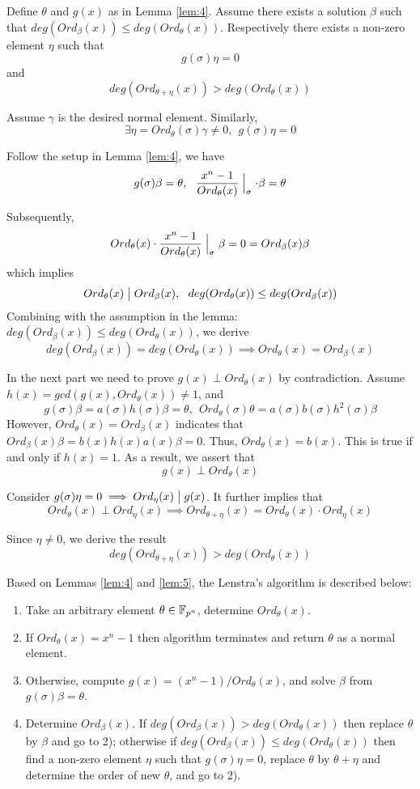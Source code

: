 \begin{Lemma}
\label{lem:5}
Define $\theta$ and $g(x)$ as in Lemma \ref{lem:4}. Assume there exists a solution 
$\beta$ such that $deg(Ord_\beta(x)) \leq deg(Ord_\theta(x))$. Respectively there exists a non-zero element $\eta$ such that
$$g(\sigma)\eta = 0$$
and
$$deg(Ord_{\theta+\eta}(x)) > deg(Ord_\theta(x))$$
\end{Lemma}
\begin{Proof}
Assume $\gamma$ is the desired normal element. Similarly,
$$\exists \eta = Ord_\theta(\sigma)\gamma \neq 0,~~g(\sigma)\eta = 0$$

Follow the setup in Lemma \ref{lem:4}, we have
$$g(\sigma)\beta = \theta,~~\frac{x^n-1}{Ord_\theta(x)}\Bigm|_\sigma\cdot \beta = \theta$$

Subsequently,
$$Ord_\theta(x)\cdot \frac{x^n-1}{Ord_\theta(x)}\Bigm|_\sigma\beta = 0 = Ord_\beta(x)\beta$$
which implies
$$Ord_\theta(x)\bigm|Ord_\beta(x),~~deg(Ord_\theta(x)) \leq deg(Ord_\beta(x))$$
Combining with the assumption in the lemma: $deg(Ord_\beta(x)) \leq deg(Ord_\theta(x))$, we derive
$$deg(Ord_\beta(x)) = deg(Ord_\theta(x))\implies Ord_\theta(x) =Ord_\beta(x)$$

In the next part we need to prove $g(x)\perp Ord_\theta(x)$ by contradiction. Assume 
$h(x) = gcd(g(x),Ord_\theta(x))\neq 1$, and
$$g(\sigma)\beta = a(\sigma)h(\sigma)\beta = \theta,~~Ord_\theta(\sigma)\theta = a(\sigma)b(\sigma)h^2(\sigma)\beta$$
However, $Ord_\theta(x) =Ord_\beta(x)$ indicates that $Ord_\beta(x)\beta = b(x)h(x)a(x)\beta = 0$. Thus,
$Ord_\theta(x)=b(x)$. This is true if and only if $h(x)=1$. As a result, we assert that
$$g(x) \perp Ord_\theta(x)$$

Consider $g(\sigma)\eta = 0 \implies Ord_\eta(x)\bigm|g(x)$. It further implies that 
$$Ord_\theta(x)\perp Ord_\eta(x) \implies Ord_{\theta+\eta}(x) = Ord_\theta(x)\cdot Ord_\eta(x)$$

Since $\eta \neq 0$, we derive the result
$$deg(Ord_{\theta+\eta}(x)) > deg(Ord_\theta(x))$$
\end{Proof}

Based on Lemmas \ref{lem:4} and \ref{lem:5}, the Lenstra's algorithm is described below:

\begin{enumerate}[{1)}]
\item Take an arbitrary element $\theta \in {\mathbb{F}}_{p^n}$, determine $Ord_\theta(x)$.
\item If $Ord_\theta(x) = x^n - 1$ then algorithm terminates and return $\theta$ as a normal element.
\item Otherwise, compute $g(x) = (x^n - 1)/Ord_\theta(x)$, and solve $\beta$ from $g(\sigma)\beta = \theta$.
\item Determine $Ord_\beta(x)$. If $deg(Ord_\beta(x)) > deg(Ord_\theta(x))$ then replace $\theta$ by $\beta$ and go to 2);
otherwise if $deg(Ord_\beta(x)) \leq deg(Ord_\theta(x))$ then find a non-zero element $\eta$ such that $g(\sigma)\eta = 0$,
replace $\theta$ by $\theta + \eta$ and determine the order of new $\theta$, and go to 2).
\end{enumerate}

